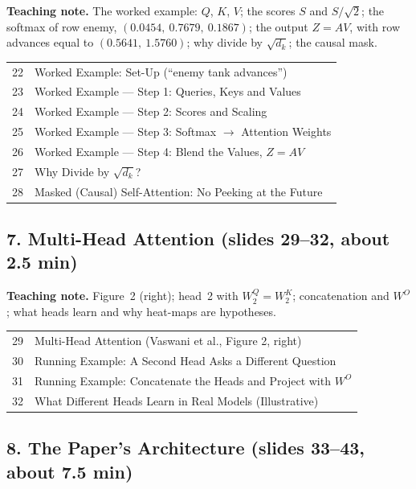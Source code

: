 \documentclass[11pt]{article}
\begin{document}
\textbf{Teaching note.} The worked example: $Q$, $K$, $V$; the scores $S$ and $S/\sqrt2$; the softmax of row enemy, $(0.0454,\ 0.7679,\ 0.1867)$; the output $Z=AV$, with row advances equal to $(0.5641,\ 1.5760)$; why divide by $\sqrt{d_k}$; the causal mask.

\begin{center}\small\renewcommand{\arraystretch}{1.1}\begin{tabularx}{\textwidth}{@{}r X@{}}22 & Worked Example: Set-Up (``enemy tank advances'')\\
23 & Worked Example --- Step 1: Queries, Keys and Values\\
24 & Worked Example --- Step 2: Scores and Scaling\\
25 & Worked Example --- Step 3: Softmax $\rightarrow$ Attention Weights\\
26 & Worked Example --- Step 4: Blend the Values, $Z=AV$\\
27 & Why Divide by $\sqrt{d_k}$?\\
28 & Masked (Causal) Self-Attention: No Peeking at the Future\\\end{tabularx}\end{center}

\subsection{7. Multi-Head Attention \normalfont\small\color{GreyN}(slides 29--32, about 2.5 min)}

\textbf{Teaching note.} Figure~2 (right); head~2 with $W^Q_2=W^K_2$; concatenation and $W^O$; what heads learn and why heat-maps are hypotheses.

\begin{center}\small\renewcommand{\arraystretch}{1.1}\begin{tabularx}{\textwidth}{@{}r X@{}}29 & Multi-Head Attention (Vaswani et al., Figure 2, right)\\
30 & Running Example: A Second Head Asks a Different Question\\
31 & Running Example: Concatenate the Heads and Project with $W^O$\\
32 & What Different Heads Learn in Real Models (Illustrative)\\\end{tabularx}\end{center}

\subsection{8. The Paper's Architecture \normalfont\small\color{GreyN}(slides 33--43, about 7.5 min)}
\end{document}
